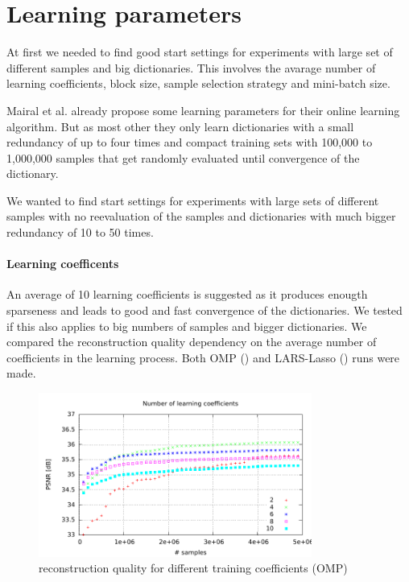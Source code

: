 \section{Learning parameters}
At first we needed to find good start settings for experiments with large set of
different samples and big dictionaries. This involves the
avarage number of learning coefficients, block size, sample selection strategy
and mini-batch size.

Mairal et al. already propose some learning parameters for their online
learning algorithm. But as most other they only learn dictionaries with
a small redundancy of up to four times and compact training sets with 100,000
to 1,000,000 samples that get randomly evaluated until convergence of the
dictionary.

We wanted to find start settings for experiments with large sets of
different samples with no reevaluation of the samples and dictionaries
with much bigger redundancy of 10 to 50 times.


\paragraph{Learning coefficents}
An average of 10 learning coefficients is suggested as it produces enougth
sparseness and leads to good and fast convergence of the dictionaries.
We tested if this also applies to big numbers of samples and bigger
dictionaries. We compared the reconstruction quality dependency on the average
number of coefficients in the learning process. Both OMP
() and LARS-Lasso () runs
were made.
\begin{figure}[H]
\centering
\includegraphics[width = 0.8\textwidth]{../tests/results/old/coeffsConverg.pdf}
\caption{reconstruction quality for different training coefficients (OMP)}
\label{fig:coeffsOMP}
\end{figure}

